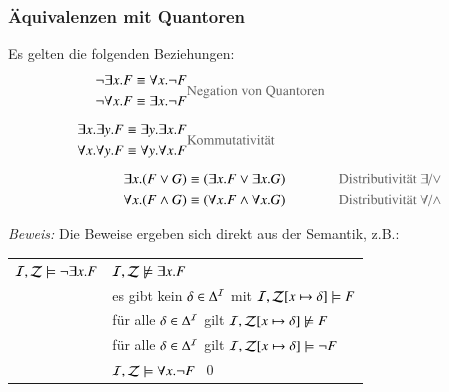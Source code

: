 \documentclass[aspectratio=1610,onlymath]{beamer}
\begin{document}
\begin{frame}\frametitle{Äquivalenzen mit Quantoren}

Es gelten die folgenden Beziehungen:
\begin{align*}
\begin{split}
\neg\exists x.F &\equiv \forall x.\neg F\\
\neg\forall x.F &\equiv \exists x.\neg F
\end{split}
& \text{\textcolor{devilscss}{Negation von Quantoren}}\\[1ex]
%
\begin{split}
\exists x.\exists y.F &\equiv \exists y.\exists x.F\\
\forall x.\forall y.F &\equiv \forall y.\forall x.F
\end{split}
& \text{\textcolor{devilscss}{Kommutativität}}\\[1ex]
%
\exists x.(F\vee G) &\equiv (\exists x.F\vee \exists x.G) & \text{\textcolor{devilscss}{Distributivität $\exists$/$\vee$}}\\
\forall x.(F\wedge G) &\equiv (\forall x.F\wedge \forall x.G) & \text{\textcolor{devilscss}{Distributivität $\forall$/$\wedge$}}
\end{align*}

\pause\emph{Beweis:} Die Beweise ergeben sich direkt aus der Semantik, z.B.:\bigskip

\begin{tabular}{r@{ gdw. }l}
$\mathcal{I},\mathcal{Z}\models \neg\exists x.F$
& $\mathcal{I},\mathcal{Z}\not\models \exists x.F$\pause\\[-0.9ex]
& es gibt kein $\delta\in\Delta^{\mathcal{I}}$ mit $\mathcal{I},\mathcal{Z}[x\mapsto\delta]\models F$\pause\\[-0.9ex]
& für alle $\delta\in\Delta^{\mathcal{I}}$ gilt $\mathcal{I},\mathcal{Z}[x\mapsto\delta]\not\models F$\pause\\[-0.9ex]
& für alle $\delta\in\Delta^{\mathcal{I}}$ gilt $\mathcal{I},\mathcal{Z}[x\mapsto\delta]\models \neg F$\pause\\[-0.9ex]
& $\mathcal{I},\mathcal{Z}\models \forall x.\neg F$\hspace{4cm}~\qed
\end{tabular}

\end{frame}
\end{document}
